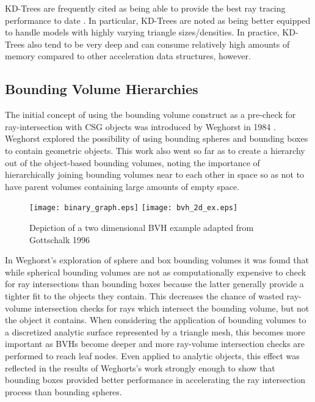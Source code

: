 KD-Trees are frequently cited as being able to provide the best ray tracing
performance to date \cite{Ernst_2007,Hurley_2002,Havran_2000}. In particular,
KD-Trees are noted as being better equipped to handle models with highly varying
triangle sizes/densities. In practice, KD-Trees also tend to be very deep and can
consume relatively high amounts of memory compared to other acceleration data
structures, however. 

\subsection{Bounding Volume Hierarchies}%
\label{subsec:BVH}
The initial concept of using the bounding volume construct as a pre-check for
ray-intersection with CSG objects was introduced by Weghorst in 1984
\cite{Weghorst_1984}. Weghorst explored the possibility of using bounding
spheres and bounding boxes to contain geometric objects. This work also went so
far as to create a hierarchy out of the object-based bounding volumes, noting the
importance of hierarchically joining bounding volumes near to each other in space
so as not to have parent volumes containing large amounts of empty space.

\begin{figure}[H]
  \centering
  \texttt{[image: binary\_graph.eps]}
  \texttt{[image: bvh\_2d\_ex.eps]}
  \caption[A 2D bounding volume hierarchy example.]{Depiction of a two dimensional BVH example adapted from Gottschalk 1996 \cite{Gottschalk_1996}}
  \label{fig:2D_bvh}
\end{figure}

In Weghorst's exploration of sphere and box bounding volumes it was found that
while spherical bounding volumes are not as computationally expensive to check
for ray intersections than bounding boxes because the latter generally provide a
tighter fit to the objects they contain. This decreases the chance of wasted
ray-volume intersection checks for rays which intersect the bounding volume, but
not the object it contains. When considering the application of bounding volumes
to a discretized analytic surface represented by a triangle mesh, this becomes
 more important as BVHs become deeper and more ray-volume intersection checks are performed to
reach leaf nodes. Even applied to analytic objects, this effect was reflected
in the results of Weghorts's work strongly enough to show that bounding boxes
provided better performance in accelerating the ray intersection process than
bounding spheres.

